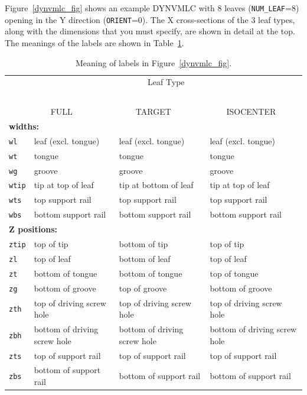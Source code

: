 \documentclass[12pt,twoside]{article}
\begin{document}
Figure~\ref{dynvmlc_fig} shows an example DYNVMLC with 8 leaves
({\tt NUM\_LEAF}=8) opening in the Y direction ({\tt ORIENT}=0).  The
X cross-sections of the 3 leaf types, along with the dimensions that
you must specify, are shown in detail at the top.  The meanings of the
labels are shown in Table~\ref{dynvmlc_tab}.
\begin{table}[htb]
\caption{Meaning of labels in Figure~\ref{dynvmlc_fig}.}
\hspace*{-0.5cm}\begin{tabular}{llll}
\\
& \multicolumn{3}{c}{Leaf Type}\\
& \multicolumn{3}{c}{~~~}\\
& ~~~~FULL & ~~~~TARGET & ~~~~ISOCENTER \\
\hline
\multicolumn{4}{l}{{\bf widths:}} \\
{\tt wl} & leaf (excl. tongue) & leaf (excl. tongue) & leaf (excl. tongue)\\
{\tt wt} & tongue & tongue & tongue\\
{\tt wg} & groove & groove & groove\\
{\tt wtip} & tip at top of leaf & tip at bottom of leaf & tip at top of leaf\\
{\tt wts} & top support rail & top support rail & top support rail\\
{\tt wbs} & bottom support rail & bottom support rail & bottom support rail\\
\hline
\multicolumn{4}{l}{{\bf Z positions:}} \\
{\tt ztip} & top of tip & bottom of tip & top of tip\\
{\tt zl} & top of leaf & bottom of leaf & top of leaf\\
{\tt zt} & bottom of tongue & bottom of tongue & top of tongue\\
{\tt zg} & bottom of groove & top of groove & bottom of groove\\
{\tt zth} & top of driving screw hole & top of driving screw hole & top of driving screw hole\\
{\tt zbh} & bottom of driving screw hole & bottom of driving screw hole & bottom of driving screw hole\\
{\tt zts} & top of support rail & top of support rail & top of support rail\\
{\tt zbs} & bottom of support rail & bottom of support rail & bottom of support rail\\
\end{tabular}
\label{dynvmlc_tab}
\end{table}
\end{document}
